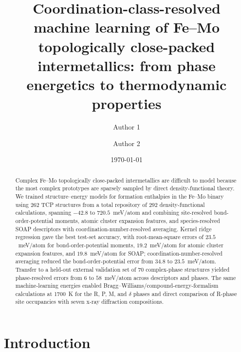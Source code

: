 \documentclass[prb,twocolumn,floatfix]{revtex4-2}
\begin{document}
\title{Coordination-class-resolved machine learning of Fe--Mo topologically close-packed intermetallics: from phase energetics to thermodynamic properties}

\author{Author 1}

\author{Author 2}

\date{\today}

\begin{abstract}
Complex Fe--Mo topologically close-packed intermetallics are difficult to model because the most complex prototypes are sparsely sampled by direct density-functional theory. We trained structure--energy models for formation enthalpies in the Fe--Mo binary using 262 TCP structures from a total repository of 292 density-functional calculations, spanning $-42.8$ to $720.5$~meV/atom and combining site-resolved bond-order-potential moments, atomic cluster expansion features, and species-resolved SOAP descriptors with coordination-number-resolved averaging. Kernel ridge regression gave the best test-set accuracy, with root-mean-square errors of $23.5$~meV/atom for bond-order-potential moments, $19.2$~meV/atom for atomic cluster expansion features, and $19.8$~meV/atom for SOAP; coordination-number-resolved averaging reduced the bond-order-potential error from $34.8$ to $23.5$~meV/atom. Transfer to a held-out external validation set of 70 complex-phase structures yielded phase-resolved errors from $6$ to $58$~meV/atom across descriptors and phases. The same machine-learning energies enabled Bragg--Williams/compound-energy-formalism calculations at 1700~K for the R, P, M, and $\delta$ phases and direct comparison of R-phase site occupancies with seven x-ray diffraction compositions.
\end{abstract}

\maketitle

\section{Introduction}
\end{document}
